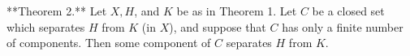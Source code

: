 **Theorem 2.** Let $X, H$, and $K$ be as in Theorem 1. Let $C$ be a closed set which separates $H$ from $K$ (in $X$), and suppose that $C$ has only a finite number of components. Then some component of $C$ separates $H$ from $K$.
